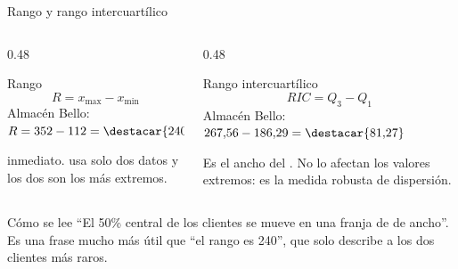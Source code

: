 \documentclass[aspectratio=169,10pt]{beamer}
\begin{document}

\begin{frame}{Rango y rango intercuartílico}
  \footnotesize
  \begin{columns}[T,onlytextwidth]
    \begin{column}{0.48\textwidth}
      \begin{block}{Rango}
        \scriptsize
        \[ R = x_{\max} - x_{\min} \]
        Almacén Bello: $R = 352 - 112 = \destacar{240}$

        \vspace{0.1cm}
         inmediato.
         usa solo dos datos y los dos son los más extremos.
      \end{block}
    \end{column}
    \begin{column}{0.48\textwidth}
      \begin{exampleblock}{Rango intercuartílico}
        \scriptsize
        \[ RIC = Q_3 - Q_1 \]
        Almacén Bello: $267{,}56 - 186{,}29 = \destacar{81{,}27}$

        \vspace{0.1cm}
        Es el ancho del . No lo afectan los valores
        extremos: es la medida robusta de dispersión.
      \end{exampleblock}
    \end{column}
  \end{columns}

  \vspace{0.15cm}
  \begin{alertblock}{Cómo se lee}
    \scriptsize
    ``El 50\% central de los clientes se mueve en una franja de
     de ancho''. Es una frase mucho más útil que ``el
    rango es 240'', que solo describe a los dos clientes más raros.
  \end{alertblock}
\end{frame}
\end{document}
